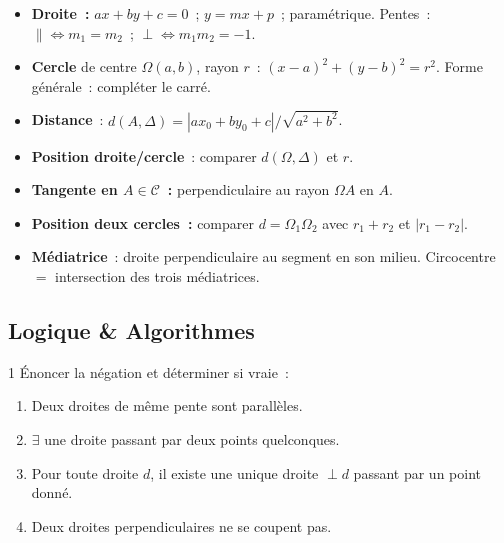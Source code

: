 \begin{bilan}
\begin{itemize}
  \item \textbf{Droite~:} $ax+by+c=0$~; $y=mx+p$~; param\'etrique.
        Pentes~: $\parallel \Leftrightarrow m_1=m_2$~;
        $\perp \Leftrightarrow m_1m_2=-1$.
  \item \textbf{Cercle} de centre $\Omega(a,b)$, rayon $r$~:
        $(x-a)^2+(y-b)^2=r^2$.
        Forme g\'en\'erale~: compl\'eter le carr\'e.
  \item \textbf{Distance}~: $d(A,\Delta)=|ax_0+by_0+c|/\sqrt{a^2+b^2}$.
  \item \textbf{Position droite/cercle}~: comparer $d(\Omega,\Delta)$ et $r$.
  \item \textbf{Tangente en $A\in\mathcal{C}$~:}
        perpendiculaire au rayon $\Omega A$ en $A$.
  \item \textbf{Position deux cercles~:}
        comparer $d=\Omega_1\Omega_2$ avec $r_1+r_2$ et $|r_1-r_2|$.
  \item \textbf{M\'ediatrice}~: droite perpendiculaire au segment en son milieu.
        Circocentre $=$ intersection des trois m\'ediatrices.
\end{itemize}

\subsection*{Logique \& Algorithmes}

\begin{exo}{1}
\'Enoncer la n\'egation et d\'eterminer si vraie~:
\begin{enumerate}
  \item \og Deux droites de m\^eme pente sont parall\`eles.\fg
  \item \og $\exists$ une droite passant par deux points quelconques.\fg
  \item \og Pour toute droite $d$, il existe une unique droite $\perp d$
        passant par un point donn\'e.\fg
  \item \og Deux droites perpendiculaires ne se coupent pas.\fg
\end{enumerate}
\end{exo}


\end{bilan}
